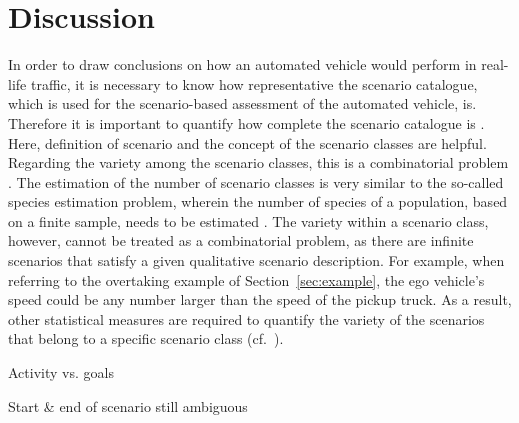 \section{Discussion}
\label{sec:discussion}

In order to draw conclusions on how an automated vehicle would perform in real-life traffic, it is necessary to know how representative the scenario catalogue, which is used for the scenario-based assessment of the automated vehicle, is. Therefore it is important to quantify how complete the scenario catalogue is \cite{geyer2014, alvarez2017prospective, stellet2015taxonomy}. Here, definition of scenario and the concept of the scenario classes are helpful. Regarding the variety among the scenario classes, this is a combinatorial problem \cite{geyer2014}. The estimation of the number of scenario classes is very similar to the so-called species estimation problem, wherein the number of species of a population, based on a finite sample, needs to be estimated \cite{yang2012estimating, bunge1993estimating}. The variety within a scenario class, however, cannot be treated as a combinatorial problem, as there are infinite scenarios that satisfy a given qualitative scenario description. For example, when referring to the overtaking example of Section~\ref{sec:example}, the ego vehicle's speed could be any number larger than the speed of the pickup truck. As a result, other statistical measures are required to quantify the variety of the scenarios that belong to a specific scenario class (cf.~\cite{wang2017much}).

\color{red}

Activity vs. goals

Start \& end of scenario still ambiguous

\color{black}